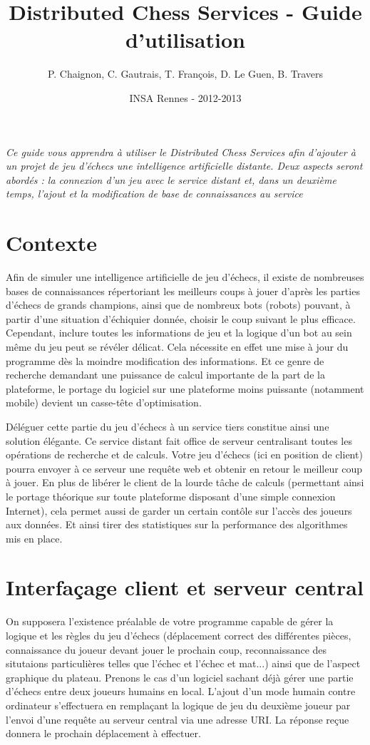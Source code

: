 \documentclass[a4paper,11pt]{article}
\title{Distributed Chess Services - Guide d'utilisation}
\author{P. Chaignon, C. Gautrais, T. François, D. Le Guen, B. Travers}
\date{INSA Rennes - 2012-2013}
\begin{document}
\maketitle{}

{\it Ce guide vous apprendra à utiliser le Distributed Chess Services afin d'ajouter à un projet de jeu d'échecs une intelligence artificielle distante. Deux aspects seront abordés : la connexion d'un jeu avec le service distant et, dans un deuxième temps, l'ajout et la modification de base de connaissances au service}

\section*{Contexte}
	Afin de simuler une intelligence artificielle de jeu d'échecs, il existe de nombreuses bases de connaissances répertoriant les meilleurs coups à jouer d'après les parties d'échecs de grands champions, ainsi que de nombreux bots (robots) pouvant, à partir d'une situation d'échiquier donnée, choisir le coup suivant le plus efficace. Cependant, inclure toutes les informations de jeu et la logique d'un bot au sein même du jeu peut se révéler délicat. Cela nécessite en effet une mise à jour du programme dès la moindre modification des informations. Et ce genre de recherche demandant une puissance de calcul importante de la part de la plateforme, le portage du logiciel sur une plateforme moins puissante (notamment mobile) devient un casse-tête d'optimisation.
	
	Déléguer cette partie du jeu d'échecs à un service tiers constitue ainsi une solution élégante. Ce service distant fait office de serveur centralisant toutes les opérations de recherche et de calculs. Votre jeu d'échecs (ici en position de client) pourra envoyer à ce serveur une requête web et obtenir en retour le meilleur coup à jouer. En plus de libérer le client de la lourde tâche de calculs (permettant ainsi le portage théorique sur toute plateforme disposant d'une simple connexion Internet), cela permet aussi de garder un certain contôle sur l'accès des joueurs aux données. Et ainsi tirer des statistiques sur la performance des algorithmes mis en place.

\section{Interfaçage client et serveur central}
	On supposera l'existence préalable de votre programme capable de gérer la logique et les règles du jeu d'échecs (déplacement correct des différentes pièces, connaissance du joueur devant jouer le prochain coup, reconnaissance des situtaions particulières telles que l'échec et l'échec et mat...) ainsi que de l'aspect graphique du plateau. Prenons le cas d'un logiciel sachant déjà gérer une partie d'échecs entre deux joueurs humains en local. L'ajout d'un mode humain contre ordinateur s'effectuera en remplaçant la logique de jeu du deuxième joueur par l'envoi d'une requête au serveur central via une adresse URI. La réponse reçue donnera le prochain déplacement à effectuer.
	
\end{document}
